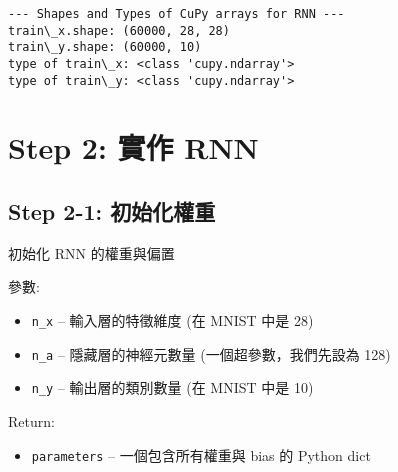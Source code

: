 \documentclass[11pt]{article}
\providecommand{\tightlist}{%
      \setlength{\itemsep}{0pt}\setlength{\parskip}{0pt}}
\begin{document}
    \begin{Verbatim}[commandchars=\\\{\}]
--- Shapes and Types of CuPy arrays for RNN ---
train\_x.shape: (60000, 28, 28)
train\_y.shape: (60000, 10)
type of train\_x: <class 'cupy.ndarray'>
type of train\_y: <class 'cupy.ndarray'>
    \end{Verbatim}

    \section{Step 2: 實作 RNN}\label{step-2-ux5be6ux4f5c-rnn}

    \subsection{Step 2-1:
初始化權重}\label{step-2-1-ux521dux59cbux5316ux6b0aux91cd}

    初始化 RNN 的權重與偏置

參數:

\begin{itemize}
\tightlist
\item
  \texttt{n\_x} -- 輸入層的特徵維度 (在 MNIST 中是 28)
\item
  \texttt{n\_a} -- 隱藏層的神經元數量 (一個超參數，我們先設為 128)
\item
  \texttt{n\_y} -- 輸出層的類別數量 (在 MNIST 中是 10)
\end{itemize}

Return:

\begin{itemize}
\tightlist
\item
  \texttt{parameters} -- 一個包含所有權重與 bias 的 Python dict
\end{itemize}
\end{document}
